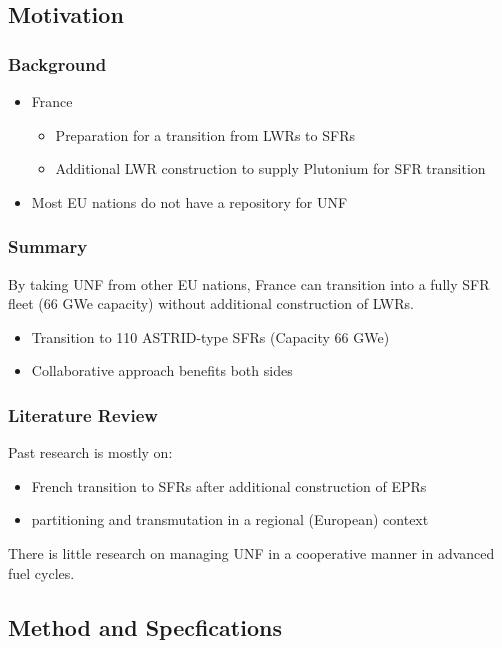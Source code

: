 \subsection{Motivation}
\begin{frame}
	\frametitle{Background}
	\begin{itemize}
		\item France 
		\begin{itemize}
			\item Preparation for a transition from \glspl{LWR} to \glspl{SFR} \cite{cne2_reports_2015}
			\item Additional \gls{LWR} construction to supply Plutonium for \gls{SFR} transition
		\end{itemize}
		\item Most EU nations do not have a repository for \gls{UNF}
	\end{itemize}
\end{frame}

\begin{frame}
	\frametitle{Summary}
	By taking \gls{UNF} from other EU nations, France can transition into a fully \gls{SFR} fleet (66 GWe capacity)
	without additional construction of \glspl{LWR}.
	\begin{itemize}
		\item Transition to 110 ASTRID-type \glspl{SFR} (Capacity 66 GWe)
		\item Collaborative approach benefits both sides
	\end{itemize}
\end{frame}

\begin{frame}
	\frametitle{Literature Review}
	Past research is mostly on:
	\begin{itemize}
		\item French transition to \glspl{SFR} after additional construction of \glspl{EPR} 	
		\cite{carre_overview_2009, martin_symbiotic_2017, freynet_multiobjective_2016}
		\item partitioning and transmutation in a regional (European) context \cite{fazio_study_2013}
	\end{itemize}

	There is little research on managing \gls{UNF} in a cooperative manner in
	advanced fuel cycles.
\end{frame}

\subsection{Method and Specfications}

